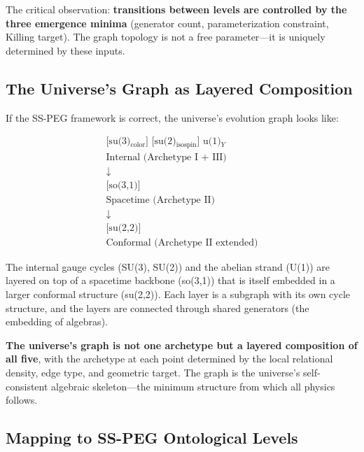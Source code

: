 The critical observation: \textbf{transitions between levels are controlled by the three emergence minima} (generator count, parameterization constraint, Killing target). The graph topology is not a free parameter---it is uniquely determined by these inputs.

\subsection{The Universe's Graph as Layered Composition}\label{sec:universe_graph}

If the SS-PEG framework is correct, the universe's evolution graph looks like:

\begin{equation}
\begin{array}{c}
\text{[su(3)$_{\mathrm{color}}$] \ \ [su(2)$_{\mathrm{isospin}}$] \ \ u(1)$_Y$} \\
\text{Internal (Archetype I + III)} \\
\downarrow \\
\text{[so(3,1)]} \\
\text{Spacetime (Archetype II)} \\
\downarrow \\
\text{[su(2,2)]} \\
\text{Conformal (Archetype II extended)}
\end{array}
\end{equation}

The internal gauge cycles (SU(3), SU(2)) and the abelian strand (U(1)) are layered on top of a spacetime backbone (so(3,1)) that is itself embedded in a larger conformal structure (su(2,2)). Each layer is a subgraph with its own cycle structure, and the layers are connected through shared generators (the embedding of algebras).

\textbf{The universe's graph is not one archetype but a layered composition of all five}, with the archetype at each point determined by the local relational density, edge type, and geometric target. The graph is the universe's self-consistent algebraic skeleton---the minimum structure from which all physics follows.

\subsection{Mapping to SS-PEG Ontological Levels}\label{sec:ontological_mapping}

